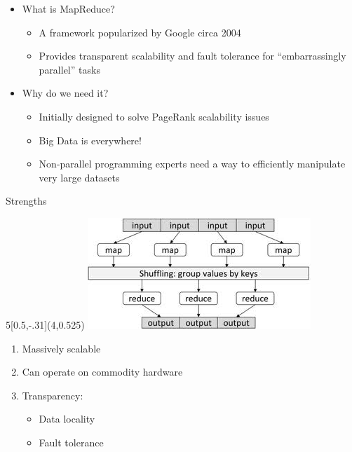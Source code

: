 \documentclass{beamer}
\begin{document}
\begin{frame}
\begin{minipage}{7.8cm}
\begin{itemize}
\item What is MapReduce?
	\begin{itemize}
	\item A framework popularized by Google circa 2004
	\item Provides transparent scalability and fault tolerance for ``embarrassingly parallel'' tasks
	\end{itemize}
\item Why do we need it? 
	\begin{itemize}
	\item Initially designed to solve PageRank scalability issues
	\item Big Data is everywhere!
	\item Non-parallel programming experts need a way to efficiently manipulate very large datasets
	\end{itemize}
\end{itemize}
\end{minipage}

\end{frame}


\begin{frame}{Strengths}

\begin{textblock}{5}[0.5,-.31](4,0.525)
\includegraphics[scale=.6]{mapreduce.jpeg}
\end{textblock}

\begin{minipage}{4cm}
\begin{enumerate}[1)]
\item Massively scalable
\item Can operate on commodity hardware
\item Transparency:
	\begin{itemize}
	\item Data locality
	\item Fault tolerance
	\end{itemize}
\end{enumerate}
\end{minipage}

\end{frame}
\end{document}
